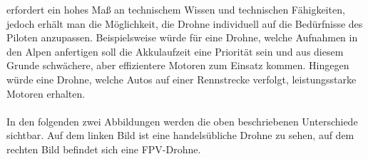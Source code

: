         erfordert ein hohes Maß an technischem Wissen und technischen Fähigkeiten, jedoch erhält man die Möglichkeit,
        die Drohne individuell auf die Bedürfnisse des Piloten anzupassen. Beispielsweise würde für eine Drohne,
        welche Aufnahmen in den Alpen anfertigen soll die Akkulaufzeit eine Priorität sein und aus diesem Grunde
        schwächere, aber effizientere Motoren zum Einsatz kommen. Hingegen würde eine Drohne, welche Autos
        auf einer Rennstrecke verfolgt, leistungsstarke Motoren erhalten. \\
        \\
        In den folgenden zwei Abbildungen werden die oben beschriebenen Unterschiede sichtbar. Auf dem linken
        Bild ist eine handelsübliche Drohne zu sehen, auf dem rechten Bild befindet sich eine FPV-Drohne.

